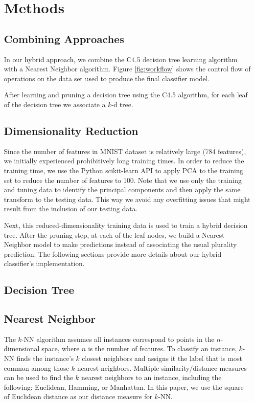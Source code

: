 \section{Methods}
\subsection{Combining Approaches}
In our hybrid approach, we combine the C4.5 decision tree learning algorithm with a Nearest Neighbor algorithm. Figure \ref{fig:workflow} shows the control flow of operations on the data set used to produce the final classifier model.

After learning and pruning a decision tree using the C4.5 algorithm, for each leaf of the decision tree we associate a $k$-d tree.

\subsection{Dimensionality Reduction}
Since the number of features in MNIST dataset is relatively large (784 features), we initially experienced prohibitively long training times. In order to reduce the training time, we use the Python scikit-learn API to apply PCA to the training set to reduce the number of features to 100. Note that we use only the training and tuning data to identify the principal components and then apply the same transform to the testing data. This way we avoid any overfitting issues that might result from the inclusion of our testing data.

Next, this reduced-dimensionality training data is used to train a hybrid decision tree. After the pruning step, at each of the leaf nodes, we build a Nearest Neighbor model to make predictions instead of associating the usual plurality prediction. The following sections provide more details about our hybrid classifier's implementation.

\subsection{Decision Tree}

\subsection{Nearest Neighbor}
The $k$-NN algorithm assumes all instances correspond to points in the $n$-dimensional space, where $n$ is the number of features. To classify an instance, $k$-NN finds the instance's $k$ closest neighbors and assigns it the label that is most common among those $k$ nearest neighbors. Multiple similarity/distance measures can be used to find the $k$ nearest neighbors to an instance, including the following: Euclidean, Hamming, or Manhattan. In this paper, we use the square of Euclidean distance as our distance measure for $k$-NN.

